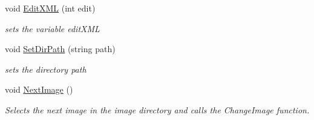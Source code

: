 \begin{DoxyCompactItemize}
void \hyperlink{classGUIFrame_a741ba1099c1b415d0e736e22944940a2}{EditXML} (int edit)
\begin{DoxyCompactList}\small\item\em sets the variable editXML \item\end{DoxyCompactList}\item 
void \hyperlink{classGUIFrame_a04da9b988d00ef3f439f643db4302f04}{SetDirPath} (string path)
\begin{DoxyCompactList}\small\item\em sets the directory path \item\end{DoxyCompactList}\item 
\hypertarget{classGUIFrame_a3fec2277dce6b2394abdb9cef2380dd0}{
void \hyperlink{classGUIFrame_a3fec2277dce6b2394abdb9cef2380dd0}{NextImage} ()}
\label{classGUIFrame_a3fec2277dce6b2394abdb9cef2380dd0}

\begin{DoxyCompactList}\small\item\em Selects the next image in the image directory and calls the ChangeImage function. \item\end{DoxyCompactList}\end{DoxyCompactItemize}
